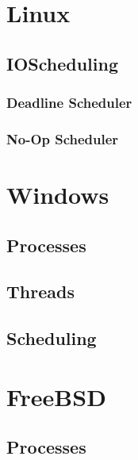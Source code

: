 \documentclass[letterpaper,10pt,notitlepage,fleqn]{article}
\begin{document}
\section{Linux}




\subsection{IOScheduling}

\subsubsection{Deadline Scheduler}


\subsubsection{No-Op Scheduler}



\section{Windows}

\subsection{Processes}

\subsection{Threads}

\subsection{Scheduling}



\section{FreeBSD}

\subsection{Processes}
\end{document}
